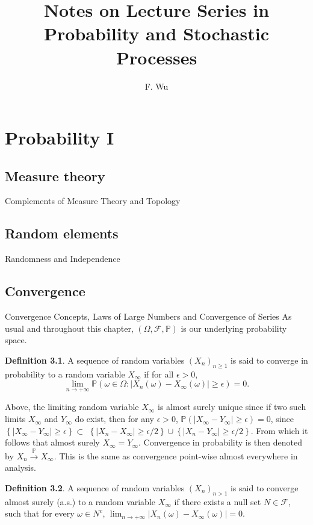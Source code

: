 \documentclass[11pt]{amsbook}
\title{Notes on Lecture Series in Probability and Stochastic Processes }
\author{F. Wu}
\date{}
\theoremstyle{plain}%
\theoremstyle{definition}
\newtheorem{defn}{Definition}[section]
\theoremstyle{remark}
\begin{document}
\maketitle
\tableofcontents
\part{Probability I}
\chapter{Measure theory}{Complements of Measure Theory and Topology}
\chapter{Random elements}{Randomness and Independence}
\chapter{Convergence}{Convergence Concepts, Laws of Large Numbers and Convergence of Series}
As usual and throughout this chapter, $(\Omega, \mathcal{F}, \mathbb{P})$ is our underlying probability space.
\begin{defn}
    A sequence of random variables $\left(X_{n}\right)_{n \geq 1}$ is said to converge in probability to a random variable $X_{\infty}$ if for all $\epsilon>0$, 
    \[\lim _{n \rightarrow+\infty} \mathbb{P}\left(\omega \in \Omega:\left|X_{n}(\omega)-X_{\infty}(\omega)\right| \geq \epsilon\right)=0.\]
\end{defn}

Above, the limiting random variable $X_{\infty}$ is almost surely unique since if two such limits $X_{\infty}$ and $Y_{\infty}$ do exist, then for any $\epsilon>0$,
$\mathbb{P}\left(\left|X_{\infty}-Y_{\infty}\right| \geq \epsilon\right)=0$, since $\left\{\left|X_{\infty}-Y_{\infty}\right| \geq \epsilon\right\} \subset$ $\left\{\left|X_{n}-X_{\infty}\right| \geq \epsilon / 2\right\} \cup\left\{\left|X_{n}-Y_{\infty}\right| \geq \epsilon / 2\right\}$. From which it follows that almost surely $X_{\infty}=Y_{\infty}$. Convergence in probability is then denoted by $X_{n} \xrightarrow{\mathbb{P}} X_{\infty}$.
This is the same as convergence point-wise almost everywhere in analysis.

\begin{defn}
    A sequence of random variables $\left(X_{n}\right)_{n>1}$ is said to converge almost surely (a.s.) to a random variable $X_{\infty}$ if there exists a null set $N \in \mathcal{F}$, such that for every $\omega \in N^{c}$, $\lim _{n \rightarrow+\infty}\left|X_{n}(\omega)-X_{\infty}(\omega)\right|=0$.
\end{defn}
\end{document}
